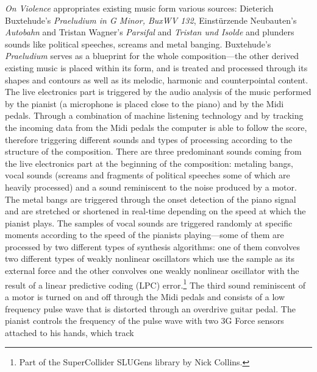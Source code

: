 \emph{On Violence} appropriates existing music form various sources: Dieterich Buxtehude's \emph{Praeludium in G Minor, BuxWV 132}, Einst\"{u}rzende Neubauten's \emph{Autobahn} and  Tristan Wagner's \emph{Parsifal} and \emph{Tristan und Isolde} and plunders sounds like political speeches, screams and metal banging. Buxtehude's \emph{Praeludium} serves as a blueprint for the whole composition---the other derived existing music is placed within its form, and is treated and processed through its shapes and contours as well as its melodic, harmonic and counterpointal content. The live electronics part is triggered by the audio analysis of the music performed by the pianist (a microphone is placed close to the piano) and by the Midi pedals. Through a combination of machine listening technology and by tracking the incoming data from the Midi pedals the computer is able to follow the score, therefore triggering different sounds and types of processing according to the structure of the composition. There are three predominant sounds coming from the live electronics part at the beginning of the composition: metaling bangs, vocal sounds (screams and fragments of political speeches some of which are heavily processed) and a sound reminiscent to the noise produced by a motor. The metal bangs are triggered through the onset detection of the piano signal and are stretched or shortened in real-time depending on the speed at which the pianist plays. The samples of vocal sounds are triggered randomly at specific moments according to the speed of the pianists playing---some of them are processed by two different types of synthesis algorithms: one of them convolves two different types of weakly nonlinear oscillators which use the sample as its external force and the other convolves one weakly nonlinear oscillator with the result of a linear predictive coding (LPC) error.\footnote{Part of the SuperCollider SLUGens library by Nick Collins.} The third sound reminiscent of a motor is turned on and off through the Midi pedals and consists of a low frequency pulse wave that is distorted through an overdrive guitar pedal. The pianist controls the frequency of the pulse wave with two 3G Force sensors attached to his hands, which track

